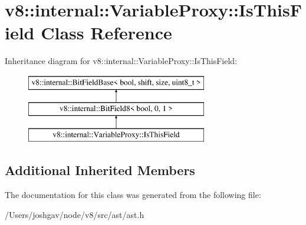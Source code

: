 \hypertarget{classv8_1_1internal_1_1_variable_proxy_1_1_is_this_field}{}\section{v8\+:\+:internal\+:\+:Variable\+Proxy\+:\+:Is\+This\+Field Class Reference}
\label{classv8_1_1internal_1_1_variable_proxy_1_1_is_this_field}
Inheritance diagram for v8\+:\+:internal\+:\+:Variable\+Proxy\+:\+:Is\+This\+Field\+:\begin{figure}[H]
\begin{center}
\leavevmode
\includegraphics[height=3.000000cm]{classv8_1_1internal_1_1_variable_proxy_1_1_is_this_field}
\end{center}
\end{figure}
\subsection*{Additional Inherited Members}


The documentation for this class was generated from the following file\+:\begin{DoxyCompactItemize}
\item 
/\+Users/joshgav/node/v8/src/ast/ast.\+h\end{DoxyCompactItemize}
